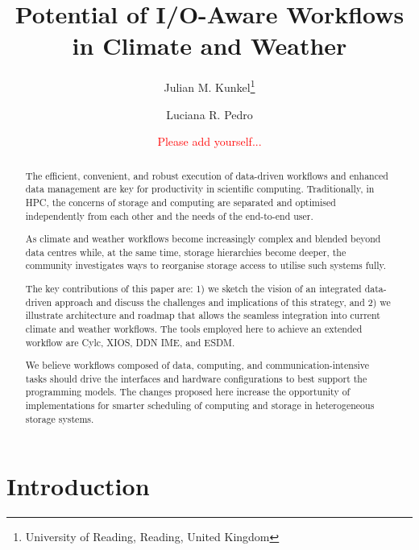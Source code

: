 \documentclass{superfri}
\begin{document}
\author{Julian M. Kunkel\footnote{\label{uread}University of Reading, Reading, United Kingdom} \and Luciana R. Pedro \and \textcolor{red}{Please add yourself...}
}

\title{Potential of I/O-Aware Workflows in Climate and Weather}

\maketitle{}

\begin{abstract}
The efficient, convenient, and robust execution of data-driven workflows and enhanced data management are key for productivity in scientific computing.
Traditionally, in HPC, the concerns of storage and computing are separated and optimised independently from each other and the needs of the end-to-end user.

As climate and weather workflows become increasingly complex and blended beyond data centres while, at the same time, storage hierarchies become deeper, the community investigates ways to reorganise storage access to utilise such systems fully.

The key contributions of this paper are:
1) we sketch the vision of an integrated data-driven approach and discuss the challenges and implications of this strategy, and 2) we illustrate architecture and roadmap that allows the seamless integration into current climate and weather workflows.
The tools employed here to achieve an extended workflow are Cylc, XIOS, DDN IME, and ESDM.

We believe workflows composed of data, computing, and communication-intensive tasks should drive the interfaces and hardware configurations to best support the programming models.
The changes proposed here increase the opportunity of implementations for smarter scheduling of computing and storage in heterogeneous storage systems.

\end{abstract}


\section*{Introduction}
\label{sec:intro}
\end{document}
